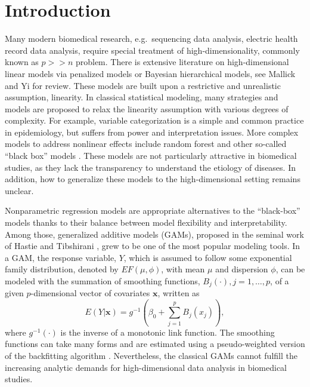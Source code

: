 \documentclass[AMA,STIX1COL,]{WileyNJD-v2}
\begin{document}
\pgfplotsset{compat=1.18}
\usetikzlibrary{shapes.geometric, arrows, positioning, calc, matrix, backgrounds, fit}
\newcommand{\bs}[1]{\boldsymbol{#1}}
\newcommand{\tp}{*}
\newcommand{\pr}{\text{Pr}}
\newcommand{\repa}{\text{repa}}
\newcommand{\simiid}{\overset{\text{iid}}{\sim}}

\hypertarget{introduction}{%
\section{Introduction}\label{introduction}}

\label{sec:intro}

Many modern biomedical research, e.g.~sequencing data analysis, electric
health record data analysis, require special treatment of
high-dimensionality, commonly known as \(p >> n\) problem. There is
extensive literature on high-dimensional linear models via penalized
models or Bayesian hierarchical models, see Mallick and Yi
\citep{Mallick2013} for review. These models are built upon a
restrictive and unrealistic assumption, linearity. In classical
statistical modeling, many strategies and models are proposed to relax
the linearity assumption with various degrees of complexity. For
example, variable categorization is a simple and common practice in
epidemiology, but suffers from power and interpretation issues. More
complex models to address nonlinear effects include random forest and
other so-called ``black box'' models \citep{Breiman2001}. These models
are not particularly attractive in biomedical studies, as they lack the
transparency to understand the etiology of diseases. In addition, how to
generalize these models to the high-dimensional setting remains unclear.

Nonparametric regression models are appropriate alternatives to the
``black-box'' models thanks to their balance between model flexibility
and interpretability. Among those, generalized additive models (GAMs),
proposed in the seminal work of Hastie and Tibshirani
\citep{Hastie1987}, grew to be one of the most popular modeling tools.
In a GAM, the response variable, \(Y\), which is assumed to follow some
exponential family distribution, denoted by \(EF(\mu, \phi)\), with mean
\(\mu\) and dispersion \(\phi\), can be modeled with the summation of
smoothing functions, \(B_j(\cdot), j = 1, \dots, p\), of a given
\(p\)-dimensional vector of covariates \(\boldsymbol{x}\), written as \[
 E(Y|\boldsymbol{x}) = g^{-1}(\beta_0 + \sum\limits^p_{j=1}B_j(x_j)),
\] where \(g^{-1}(\cdot)\) is the inverse of a monotonic link function.
The smoothing functions can take many forms and are estimated using a
pseudo-weighted version of the backfitting algorithm
\citep{Breiman1985}. Nevertheless, the classical GAMs cannot fulfill the
increasing analytic demands for high-dimensional data analysis in
biomedical studies.
\end{document}
